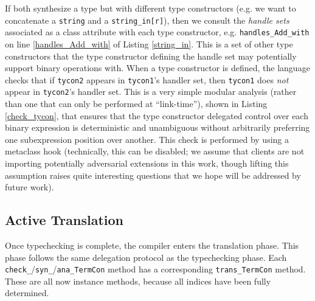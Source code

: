 \documentclass[9pt,preprint]{sigplanconf}
\newcommand{\lstinlinep}[1]{\lstinline[language=Python,basicstyle=\ttfamily\small]{#1}}
\begin{document}
If both synthesize a type but with different type constructors (e.g. we want to concatenate a \lstinlinep{string} and a \lstinlinep{string_in[r]}), then we consult the \emph{handle sets} associated as a class attribute with each type constructor, e.g. \lstinlinep{handles_Add_with} on line \ref{handles_Add_with} of Listing \ref{string_in}. This is a set of other type constructors that the type constructor defining the handle set may potentially support binary operations with. When a type constructor is defined, the language checks that if \lstinlinep{tycon2} appears in \lstinlinep{tycon1}'s handler set, then \lstinlinep{tycon1} does \emph{not} appear in \lstinlinep{tycon2}'s handler set. This is a very simple modular analysis (rather than one that can only be performed at ``link-time''), shown in Listing \ref{check_tycon}, that ensures that the type constructor delegated control over each binary expression is deterministic and  unambiguous without arbitrarily preferring one subexpression position over another. This check is performed  by using a metaclass hook (technically, this can be disabled; we assume that clients are not importing potentially adversarial extensions in this work, though lifting this assumption raises quite interesting questions that we hope will be addressed by future work).

\subsection{Active Translation}
Once typechecking is complete, the compiler enters the translation phase. %
This phase follows the same delegation protocol as the typechecking phase. Each \lstinlinep{check_}/\lstinlinep{syn_}/\lstinlinep{ana_TermCon} method has a corresponding \lstinlinep{trans_TermCon} method. These are all now instance methods, because all indices have been fully determined. 
\end{document}
